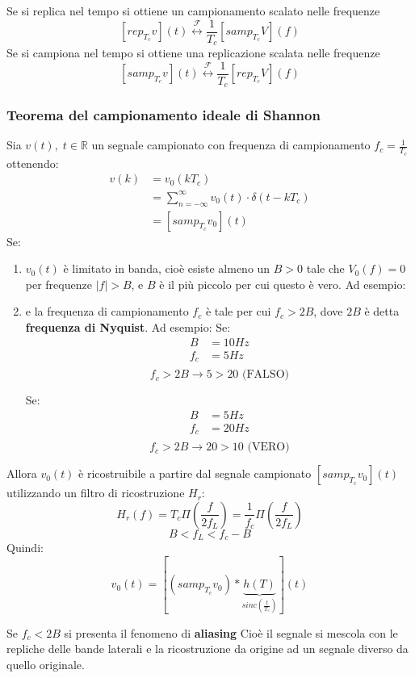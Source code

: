 \documentclass[a4paper]{article}
\begin{document}
\vspace{1em}
\noindent
Se si replica nel tempo si ottiene un campionamento scalato nelle frequenze
\[
  \left[ rep_{T_c} v\right](t) \stackrel{\mathcal{F}}{\leftrightarrow} \frac{1}{T_c} \left[ samp_{T_c} V \right](f)
\] 
Se si campiona nel tempo si ottiene una replicazione scalata nelle frequenze
\[
  \left[ samp_{T_c} v \right](t) \stackrel{\mathcal{F}}{\leftrightarrow} \frac{1}{T_c} \left[ rep_{T_c} V \right](f)
\] 

\subsubsection{Teorema del campionamento ideale di Shannon}
\begin{theorem}
  Sia \( v(t), \; t \in \mathbb{R} \) un segnale campionato con frequenza di campionamento
  \( f_c = \frac{1}{T_c} \) ottenendo:
  \[
    \begin{aligned}
      v(k) &= v_0(kT_c)\\
           &= \sum_{n = -\infty}^{\infty} v_0(t) \cdot \delta(t - kT_c)\\
           &= \left[ samp_{T_c} v_0 \right](t)
    \end{aligned}
  \] 
  Se:
  \begin{enumerate}
    \item \( v_0(t) \) è limitato in banda, cioè esiste almeno un \( B > 0 \) tale che
      \( V_0(f) = 0 \) per frequenze \( |f| > B \), e \( B \) è il più piccolo per cui
      questo è vero. Ad esempio:
      \label{16-01-D7}

    \item e la frequenza di campionamento \( f_c \) è tale per cui \( f_c > 2B \),
      dove \( 2B \) è detta \textbf{frequenza di Nyquist}. Ad esempio:
      \label{16-01-D8}
      Se:
      \[
      \begin{aligned}
        B &= 10 Hz\\
        f_c &= 5 Hz \\
      \end{aligned}
      \] 
      \[
        f_c > 2B \to 5 > 20 \text{ (FALSO)}
      \] 

      \vspace{1em}
      \noindent
      Se:
      \[
      \begin{aligned}
        B &= 5 Hz \\
        f_c &= 20 Hz \\
      \end{aligned}
      \] 
      \[
        f_c > 2B \to 20 > 10 \text{ (VERO)}
      \] 
  \end{enumerate}
  Allora \( v_0(t) \) è ricostruibile a partire dal segnale campionato 
  \( \left[ samp_{T_c} v_0\right](t) \) utilizzando un filtro di ricostruzione \( H_r \):
  \[
  H_r(f) = T_c \Pi \left( \frac{f}{2f_L} \right) = \frac{1}{f_c} \Pi \left( \frac{f}{2f_L} \right) 
  \] 
  \[
  B < f_L < f_c - B
  \] 
  Quindi:
  \[
    v_0(t) = \left[ (samp_{T_c} v_0) \ast \underbrace{h(T)}_{sinc \left( \frac{t}{T_c} \right) } \right](t)
  \] 
  
  \vspace{1em}
  \noindent
  Se \( f_c < 2B \) si presenta il fenomeno di \textbf{aliasing}
  \label{16-01-D9}
  \noindent
  Cioè il segnale si mescola con le repliche delle bande laterali e la ricostruzione
  da origine ad un segnale diverso da quello originale.
\end{theorem}
\end{document}
